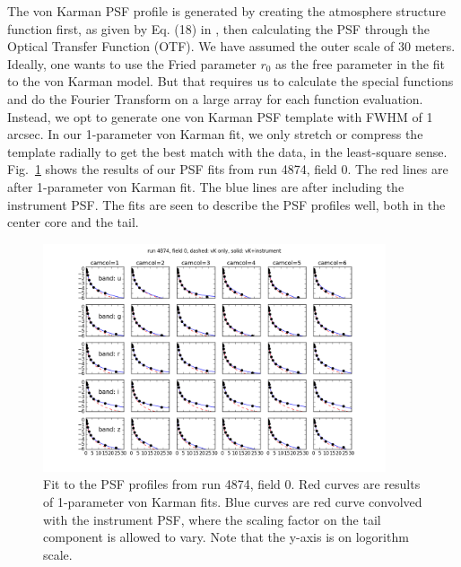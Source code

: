 The von Karman PSF profile is generated by creating the atmosphere
structure function first, as given by Eq. (18) in \cite{Tokovinin2002}, then calculating the
PSF through the Optical Transfer Function (OTF). We have assumed the
outer scale of 30 meters.
Ideally, one wants to use the Fried parameter $r_0$ as the free
parameter in the fit to the von Karman model. 
But that requires us to calculate the special functions and do the
Fourier Transform on a large array for each function evaluation.
Instead, we opt to generate one von Karman PSF template with FWHM of 1
arcsec. In our 1-parameter von Karman fit, we only stretch or compress
the template radially to get the best match with the data, in the
least-square sense.
Fig.~\ref{fig:psffit} shows the results of our PSF fits from run 4874,
field 0. The red lines are after 1-parameter von Karman fit. 
The blue lines are after including the instrument PSF.
The fits are seen to describe the PSF profiles well, both in
the center core and the tail.


\begin{figure}
\centering
\includegraphics[width=0.9\textwidth]{FIGURES/psffit.png}
\caption{Fit to the PSF profiles from run 4874, field 0. Red curves
  are results of 1-parameter von Karman fits. Blue curves are red
  curve convolved with the instrument PSF, where the scaling factor on
  the tail component is allowed to vary. Note that the y-axis is on
  logorithm scale.
\label{fig:psffit}}
\end{figure}
